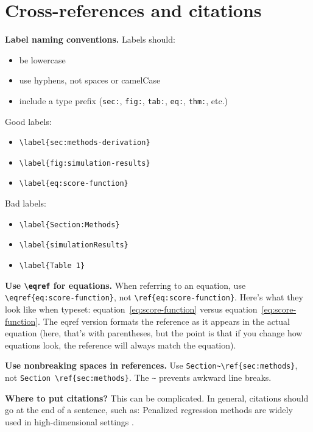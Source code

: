 \section{Cross-references and citations}

\textbf{Label naming conventions.} Labels should:

\begin{itemize}
\item be lowercase
\item use hyphens, not spaces or camelCase
\item include a type prefix (\texttt{sec:}, \texttt{fig:}, \texttt{tab:}, \texttt{eq:}, \texttt{thm:}, etc.)
\end{itemize}

Good labels:

\begin{itemize}
\item \verb|\label{sec:methods-derivation}|
\item \verb|\label{fig:simulation-results}|
\item \verb|\label{eq:score-function}|
\end{itemize}

Bad labels:

\begin{itemize}
\item \verb|\label{Section:Methods}|
\item \verb|\label{simulationResults}|
\item \verb|\label{Table 1}|
\end{itemize}

\textbf{Use \texttt{\textbackslash eqref} for equations.} When referring to an equation, use \verb|\eqref{eq:score-function}|, not \verb|\ref{eq:score-function}|. Here's what they look like when typeset: equation~\eqref{eq:score-function} versus equation~\ref{eq:score-function}. The eqref version formats the reference as it appears in the actual equation (here, that's with parentheses, but the point is that if you change how equations look, the reference will always match the equation).

\textbf{Use nonbreaking spaces in references.} Use \verb|Section~\ref{sec:methods}|, not \verb|Section \ref{sec:methods}|. The \verb|~| prevents awkward line breaks.

\textbf{Where to put citations?} This can be complicated. In general, citations should go at the end of a sentence, such as: Penalized regression methods are widely used in high-dimensional settings \citep{Hastie2009,Zou2005}.

